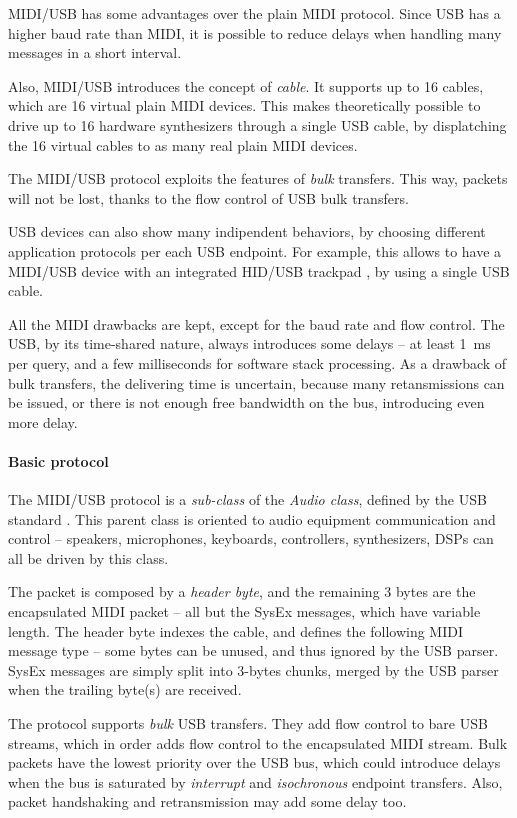 \documentclass[a4paper,10pt]{article}
\begin{document}
\begin{multicols}{2}
MIDI/USB has some advantages over the plain MIDI protocol. Since USB has a
higher baud rate than MIDI, it is possible to reduce delays when handling
many messages in a short interval.

Also, MIDI/USB introduces the concept of \emph{cable}. It supports up to 16
cables, which are 16 virtual plain MIDI devices. This makes theoretically
possible to drive up to 16 hardware synthesizers through a single USB cable,
by displatching the 16 virtual cables to as many real plain MIDI devices.

The MIDI/USB protocol exploits the features of \emph{bulk} transfers. This
way, packets will not be lost, thanks to the flow control of USB bulk
transfers.

USB devices can also show many indipendent behaviors, by choosing different
application protocols per each USB endpoint. For example, this allows to have
a MIDI/USB device with an integrated HID/USB trackpad \CITEME, by using a
single USB cable.

All the MIDI drawbacks are kept, except for the baud rate and flow control.
The USB, by its time-shared nature, always introduces some delays -- at
least 1~ms per query, and a few milliseconds for software stack processing.
As a drawback of bulk transfers, the delivering time is uncertain, because
many retansmissions can be issued, or there is not enough free bandwidth on
the bus, introducing even more delay.


\paragraph{Basic protocol}
The MIDI/USB protocol is a \emph{sub-class} of the \emph{Audio class}, defined
by the USB standard \CITEME. This parent class is oriented to audio equipment
communication and control -- speakers, microphones, keyboards, controllers,
synthesizers, DSPs can all be driven by this class.

The packet is composed by a \emph{header byte}, and the remaining 3 bytes are
the encapsulated MIDI packet -- all but the SysEx messages, which have variable
length. The header byte indexes the cable, and defines the following MIDI
message type -- some bytes can be unused, and thus ignored by the USB parser.
SysEx messages are simply split into 3-bytes chunks, merged by the USB parser
when the trailing byte(s) are received.

The protocol supports \emph{bulk} USB transfers. They add flow control to bare
USB streams, which in order adds flow control to the encapsulated MIDI stream.
Bulk packets have the lowest priority over the USB bus, which could introduce
delays when the bus is saturated by \emph{interrupt} and \emph{isochronous}
endpoint transfers. Also, packet handshaking and retransmission may add
some delay too.



\end{multicols}
\end{document}
